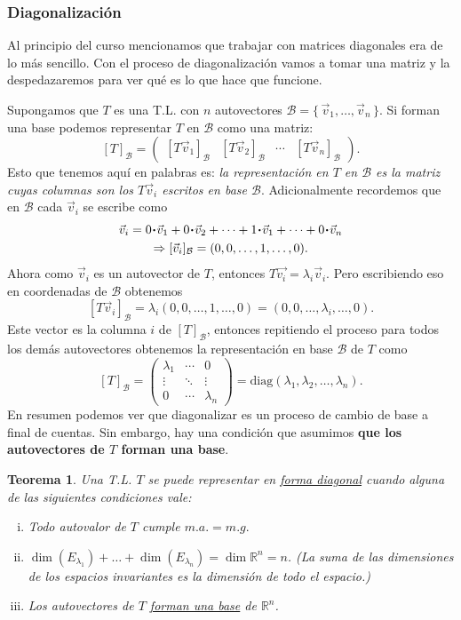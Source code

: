 \documentclass[12pt]{article}
\theoremstyle{plain}
\newtheorem{Th}{Teorema}  %
\theoremstyle{definition}
\theoremstyle{remark}
\newcommand{\la}{\lambda}           %
\newcommand{\bR}{\mathbb{R}}        %
\newcommand{\cB}{\mathcal{B}}       %
\renewcommand{\:}{\colon}           %
\newcommand{\un}[1]{\underline{#1}}
\renewcommand{\.}{\Cdot}                %
\newcommand{\threebythree}[9]{\begin{pmatrix} %
  #1 & #2 & #3 \\ #4 & #5 & #6 \\ #7 & #8 & #9 \end{pmatrix}}
\newcommand{\To}{\Rightarrow}
\newcommand{\set}[1]{\{\,#1\,\}}    %
\begin{document}
\begin{multicols}{2}

\subsubsection*{Diagonalización}

Al principio del curso mencionamos que trabajar con matrices diagonales era de lo más sencillo. Con el proceso de diagonalización vamos a tomar una matriz y la despedazaremos para ver qué es lo que hace que funcione.\par 
Supongamos que $T$ es una T.L. con $n$ autovectores $\cB=\set{\vec v_1,\dots,\vec v_n}$. Si forman una base podemos representar $T$ en $\cB$ como una matriz:
$$[T]_\cB=\begin{pmatrix}
  [T\vec v_1]_\cB&[T\vec v_2]_\cB&\cdots&[T\vec v_n]_\cB
\end{pmatrix}.$$
Esto que tenemos aquí en palabras es: \emph{la representación en $T$ en $\cB$ es la matriz cuyas columnas son los $T\vec{v}_i$ escritos en base $\cB$}. Adicionalmente recordemos que en $\cB$ cada $\vec{v}_i$ se escribe como
\begin{gather*}
  \vec{v}_i=0\.\vec{v}_1+0\.\vec{v}_2+\dots+1\.\vec{v}_1+\dots+0\.\vec{v}_n\\
  \To[\vec{v}_i]_\cB=(0,0,\dots,1,\dots,0).
\end{gather*}
Ahora como $\vec{v}_i$ es un autovector de $T$, entonces $T\vec{v_i}=\la_i\vec{v}_i$. Pero escribiendo eso en coordenadas de $\cB$ obtenemos
$$[T\vec{v}_i]_\cB=\la_i(0,0,\dots,1,\dots,0)=(0,0,\dots,\la_i,\dots,0).$$
Este vector es la columna $i$ de $[T]_\cB$, entonces repitiendo el proceso para todos los demás autovectores obtenemos la representación en base $\cB$ de $T$ como
$$[T]_\cB=\threebythree{\la_1}{\cdots}{0}{\vdots}{\ddots}{\vdots}{0}{\cdots}{\la_n}=\text{diag}(\la_1,\la_2,\dots,\la_n).$$
En resumen podemos ver que diagonalizar es un proceso de cambio de base a final de cuentas. Sin embargo, hay una condición que asumimos \textbf{que los autovectores de $T$ forman una base}.

\begin{Th}
Una T.L. $T$ se puede representar en \un{forma diagonal} cuando alguna de las siguientes condiciones vale:
\vspace*{-0.5em}
\begin{enumerate}[i)]
  \itemsep=-0.4em
  \item Todo autovalor de $T$ cumple \un{$m.a.=m.g.$}
  \item $\dim(E_{\la_1})+\dots+\dim(E_{\la_n})=\dim\bR^n=n$. (La suma de las dimensiones de los espacios invariantes es la dimensión de todo el espacio.)
  \item Los autovectores de $T$ \un{forman una base} de $\bR^n$.
\end{enumerate}
\end{Th}


\end{multicols}
\end{document}
